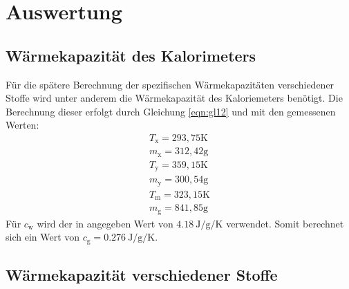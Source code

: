 \section{Auswertung}
\label{sec:Auswertung}

\subsection{Wärmekapazität des Kalorimeters}
\label{sec:Kalorie}
Für die spätere Berechnung der spezifischen Wärmekapazitäten verschiedener Stoffe wird unter anderem die Wärmekapazität des Kaloriemeters benötigt.
Die Berechnung dieser erfolgt durch Gleichung \eqref{eqn:gl12} und mit den gemessenen Werten:
\begin{align*}
 T_\text{x} = 293,75 \text{K}\\
 m_\text{x} = 312,42 \text{g}\\
 T_\text{y} = 359,15 \text{K}\\
 m_\text{y} = 300,54 \text{g}\\
 T_\text{m} = 323,15 \text{K}\\
 m_\text{g} = 841,85 \text{g}
\end{align*}
Für $c_\text{w}$ wird der in \cite{V201} angegeben Wert von $\SI{4,18}{\joule\per\gram\per\kelvin}$ verwendet.
Somit berechnet sich ein Wert von $ c_\text{g} = \SI{0,276}{\joule\per\gram\per\kelvin}.$

\subsection{Wärmekapazität verschiedener Stoffe}
\label{sec:verschiedeneStoffe}

